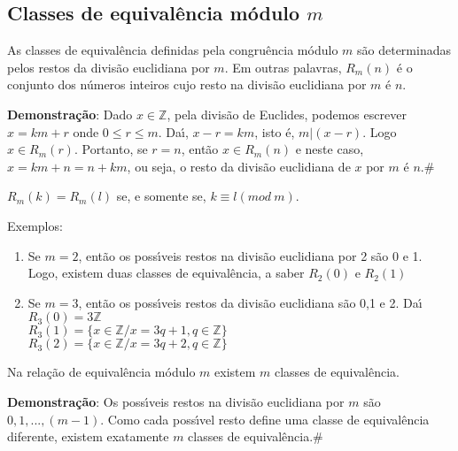 \subsection{Classes de equival{\^e}ncia m{\'o}dulo $m$}

\begin{proposicao} As classes de equival{\^e}ncia definidas pela congru{\^e}ncia m{\'o}dulo $m$ s{\~a}o determinadas pelos restos da divis{\~a}o euclidiana por $m$. Em outras palavras, $R_{m}(n)$ {\'e} o conjunto dos n{\'u}meros inteiros cujo resto na divis{\~a}o euclidiana por $m$ {\'e} $n$.\end{proposicao}

\textbf{Demonstra{\c c}{\~a}o}: Dado $x\in\mathbb{Z}$, pela divis{\~a}o de Euclides, podemos escrever $x=km+r$ onde $0\leq r\leq m$. Da{\'\i}, $x-r=km$, isto {\'e}, $m|(x-r)$. Logo $x\in R_{m}(r)$. Portanto, se $r=n$, ent{\~a}o $x\in R_{m}(n)$ e neste caso, $x=km+n=n+km$, ou seja, o resto da divis{\~a}o euclidiana de $x$ por $m$ {\'e} $n$.\#  

\begin{corolario} $R_{m}(k)=R_{m}(l)$ se, e somente se, $k\equiv l(mod\ m)$.\end{corolario}

Exemplos:
\begin{enumerate}
\item Se $m=2$, ent{\~a}o os poss{\'\i}veis restos na divis{\~a}o euclidiana por 2 s{\~a}o 0 e 1. Logo, existem duas classes de equival{\^e}ncia, a saber $R_{2}(0)$ e $R_{2}(1)$
\item Se $m=3$, ent{\~a}o os poss{\'\i}veis restos da divis{\~a}o euclidiana s{\~a}o 0,1 e 2. Da{\'\i}\\
$R_{3}(0)=3\mathbb{Z}$\\
$R_{3}(1)=\{x\in\mathbb{Z}/x=3q+1,q\in\mathbb{Z}\}$\\
$R_{3}(2)=\{x\in\mathbb{Z}/x=3q+2,q\in\mathbb{Z}\}$

\end{enumerate}

\begin{proposicao} Na rela{\c c}{\~a}o de equival{\^e}ncia m{\'o}dulo $m$ existem $m$ classes de equival{\^e}ncia.\end{proposicao}

\textbf{Demonstra{\c c}{\~a}o}: Os poss{\'\i}veis restos na divis{\~a}o euclidiana por $m$ s{\~a}o $0,1,...,(m-1)$. Como cada poss{\'\i}vel resto define uma classe de equival{\^e}ncia diferente, existem exatamente $m$ classes de equival{\^e}ncia.\#


